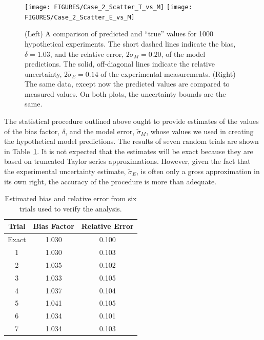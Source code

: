 \begin{figure}[t]
\begin{center}
\texttt{[image: FIGURES/Case\_2\_Scatter\_T\_vs\_M]}
\texttt{[image: FIGURES/Case\_2\_Scatter\_E\_vs\_M]}
\end{center}
\caption[Verification of the model error calculation, Case 2.]{(Left) A comparison of predicted and ``true'' values for 1000 hypothetical
experiments. The short dashed lines indicate the bias, $\delta=1.03$, and the relative error, $2\widetilde{\sigma}_M=0.20$, of the model predictions.
The solid, off-diagonal lines indicate the relative uncertainty, $2\widetilde{\sigma}_E=0.14$ of the experimental measurements.
(Right) The same data, except now the predicted values are compared to measured values. On both plots, the uncertainty bounds are the same.}
\label{Case_2_Scatter}
\end{figure}

The statistical procedure outlined above ought to provide estimates of the values of the bias factor, $\delta$, and the model error, $\widetilde{\sigma}_M$, whose
values we used in creating the hypothetical model predictions. The results of seven random trials are shown in Table~\ref{trials}. It is not expected that the
estimates will be exact because they are based on truncated Taylor series approximations. However, given the fact that the experimental uncertainty estimate,
$\widetilde{\sigma}_E$, is often only a gross approximation in its own right, the accuracy of the procedure is more than adequate.

\begin{table}[t]
\caption{Estimated bias and relative error from six trials used to verify the analysis. }
\begin{center}
\begin{tabular}{|c|c|c|}
\hline
Trial   & Bias Factor      & Relative Error \\ \hline \hline
Exact   & 1.030            &    0.100            \\ \hline \hline
1       & 1.030            &    0.103            \\ \hline
2       & 1.035            &    0.102            \\ \hline
3       & 1.033            &    0.105            \\ \hline
4       & 1.037            &    0.104            \\ \hline
5       & 1.041            &    0.105            \\ \hline
6       & 1.034            &    0.101            \\ \hline
7       & 1.034            &    0.103            \\ \hline
\end{tabular}
\end{center}
\label{trials}
\end{table}





